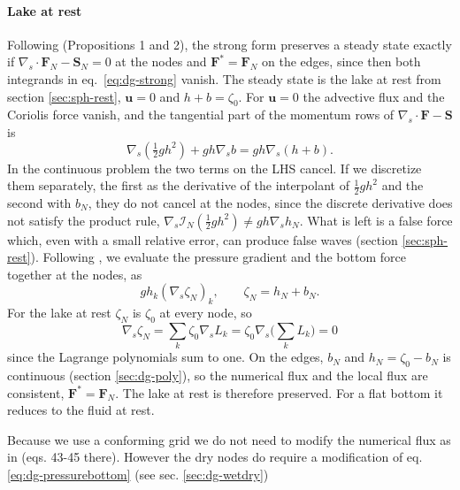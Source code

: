 \paragraph{Lake at rest}
Following \cite{bonev2018discontinuous} (Propositions 1 and 2), the strong form preserves a steady state exactly if $\nabla_s\cdot\mathbf{F}_N - \mathbf{S}_N = 0$ at the nodes and $\mathbf{F}^* = \mathbf{F}_N$ on the edges, since then both integrands in eq.~\eqref{eq:dg-strong} vanish. The steady state is the lake at rest from section \ref{sec:sph-rest}, $\mathbf{u} = 0$ and $h + b = \zeta_0$. For $\mathbf{u} = 0$ the advective flux and the Coriolis force vanish, and the tangential part of the momentum rows of $\nabla_s\cdot\mathbf{F} - \mathbf{S}$ is
\begin{equation*}
    \nabla_s\left(\tfrac12gh^2\right) + gh\nabla_s b = gh\nabla_s(h + b) .
\end{equation*}
In the continuous problem the two terms on the LHS cancel. If we discretize them separately, the first as the derivative of the interpolant of $\frac12gh^2$ and the second with $b_N$, they do not cancel at the nodes, since the discrete derivative does not satisfy the product rule, $\nabla_s\mathcal{I}_N(\frac12gh^2)\neq gh\nabla_s h_N$. What is left is a false force which, even with a small relative error, can produce false waves (section \ref{sec:sph-rest}). Following \cite{bonev2018discontinuous}, we evaluate the pressure gradient and the bottom force together at the nodes, as
\begin{equation}\label{eq:dg-pressurebottom}
    g h_k\left(\nabla_s\zeta_N\right)_k, \qquad \zeta_N = h_N + b_N .
\end{equation}
For the lake at rest $\zeta_N$ is $\zeta_0$ at every node, so
\begin{equation*}
    \nabla_s\zeta_N = \sum_k\zeta_0\nabla_s L_k = \zeta_0\nabla_s\Big(\sum_k L_k\Big) = 0
\end{equation*}
since the Lagrange polynomials sum to one. On the edges, $b_N$ and $h_N = \zeta_0 - b_N$ is continuous (section \ref{sec:dg-poly}), so the numerical flux and the local flux are consistent, $\mathbf{F}^* = \mathbf{F}_N$. The lake at rest is therefore preserved. For a flat bottom it reduces to the fluid at rest. 

Because we use a conforming grid we do not need to modify the numerical flux as in \cite{bonev2018discontinuous} (eqs. 43-45 there). However the dry nodes do require a modification of eq. \eqref{eq:dg-pressurebottom} (see sec. \ref{sec:dg-wetdry})

